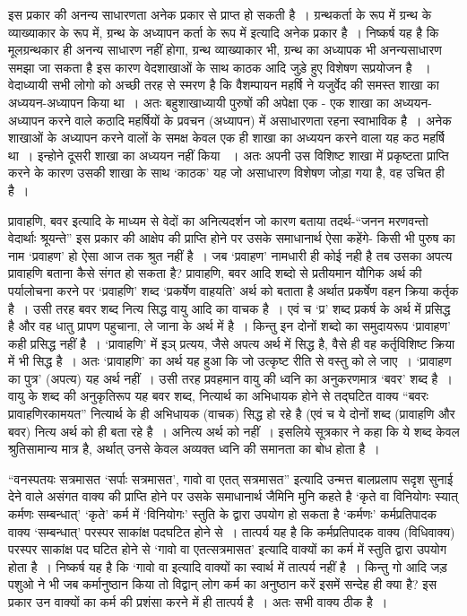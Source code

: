 इस प्रकार की अनन्य साधारणता अनेक प्रकार से प्राप्त हो सकती है~। ग्रन्थकर्ता के रूप में ग्रन्थ के व्याख्याकार के रूप में, ग्रन्थ के अध्यापन कर्ता के रूप में इत्यादि अनेक प्रकार है~। निष्कर्ष यह है कि मूलग्रन्थकार ही अनन्य साधारण नहीं होगा, ग्रन्थ व्याख्याकार भी, ग्रन्थ का अध्यापक भी अनन्यसाधारण समझा जा सकता है इस कारण वेदशाखाओं के साथ काठक आदि जुड़े हुए विशेषण सप्रयोजन है ~। वेदाध्यायी सभी लोगो को अच्छी तरह से स्मरण है कि वैशम्पायन महर्षि ने यजुर्वेद की समस्त शाखा का अध्ययन-अध्यापन किया था~। अतः बहुशाखाध्यायी पुरुषों की अपेक्षा एक - एक शाखा का अध्ययन-अध्यापन करने वाले कठादि महर्षियों के प्रवचन (अध्यापन) में असाधारणता रहना स्वाभाविक है~। अनेक शाखाओं के अध्यापन करने वालों के समक्ष केवल एक ही शाखा का अध्ययन करने वाला यह कठ महर्षि था~। इन्होने दूसरी शाखा का अध्ययन नहीं किया ~। अतः अपनी उस विशिष्ट शाखा में प्रकृष्टता प्राप्ति करने के कारण उसकी शाखा के साथ ‘काठक' यह जो असाधारण विशेषण जोड़ा गया है, वह उचित ही है~। 

प्रावाहणि, बवर इत्यादि के माध्यम से वेदों का अनित्यदर्शन जो कारण बताया तदर्थ-“जनन मरणवन्तो वेदार्थाः श्रूयन्ते” इस प्रकार की आक्षेप की प्राप्ति होने पर उसके समाधानार्थ ऐसा कहेंगे- किसी भी पुरुष का नाम ‘प्रवाहण' हो ऐसा आज तक श्रुत नहीं है~। जब ‘प्रवाहण' नामधारी ही कोई नही है तब उसका अपत्य प्रावाहणि बताना कैसे संगत हो सकता है? प्रावाहणि, बवर आदि शब्दो से प्रतीयमान यौगिक अर्थ की पर्यालोचना करने पर ‘प्रवाहणि' शब्द ‘प्रकर्षेण वाहयति' अर्थ को बताता है अर्थात प्रकर्षेण वहन क्रिया कर्तृक है~। उसी तरह बवर शब्द नित्य सिद्ध वायु आदि का वाचक है~। एवं च ‘प्र' शब्द प्रकर्ष के अर्थ में प्रसिद्ध है और वह धातु प्रापण पहुचाना, ले जाना के अर्थ में है~। किन्तु इन दोनों शब्दो का समुदायरूप ‘प्रावाहण' कही प्रसिद्ध नहीं है~। ‘प्रावाहणि' में इञ् प्रत्यय, जैसे अपत्य अर्थ में सिद्ध है, वैसे ही वह कर्तृविशिष्ट क्रिया में भी सिद्ध है~। अतः ‘प्रावाहणि' का अर्थ यह हुआ कि जो उत्कृष्ट रीति से वस्तु को ले जाए~। ‘प्रावाहण का पुत्र' (अपत्य) यह अर्थ नहीं~। उसी तरह प्रवहमान वायु की ध्वनि का अनुकरणमात्र ‘बवर' शब्द है~। वायु के शब्द की अनुकृतिरूप यह बवर शब्द, नित्यार्थ का अभिधायक होने से तद्घटित वाक्य “बवरः प्रावाहणिरकामयत” नित्यार्थ के ही अभिधायक (वाचक) सिद्ध हो रहे है (एवं च ये दोनों शब्द (प्रावाहणि और बवर) नित्य अर्थ को ही बता रहे है~। अनित्य अर्थ को नहीं~। इसलिये सूत्रकार ने कहा कि ये शब्द केवल श्रुतिसामान्य मात्र है, अर्थात् उनसे केवल अव्यक्त ध्वनि की समानता का बोध होता है~।

“वनस्पतयः सत्रमासत ‘सर्पाः सत्रमासत', गावो वा एतत् सत्रमासत” इत्यादि उन्मत्त बालप्रलाप सदृश सुनाई देने वाले असंगत वाक्य की प्राप्ति होने पर उसके समाधानार्थ जैमिनि मुनि कहते है ‘कृते वा विनियोगः स्यात् कर्मणः सम्बन्धात्' ‘कृते' कर्म में ‘विनियोगः' स्तुति के द्वारा उपयोग हो सकता है ‘कर्मणः' कर्मप्रतिपादक वाक्य ‘सम्बन्धात्' परस्पर साकांक्ष पदघटित होने से~। तात्पर्य यह है कि कर्मप्रतिपादक वाक्य (विधिवाक्य) परस्पर साकांक्ष पद घटित होने से ‘गावो वा एतत्सत्रमासत' इत्यादि वाक्यों का कर्म में स्तुति द्वारा उपयोग होता है~। निष्कर्ष यह है कि ‘गावो वा इत्यादि वाक्यों का स्वार्थ में तात्पर्य नहीं है~। किन्तु गो आदि जड़ पशुओ ने भी जब कर्मानुष्ठान किया तो विद्वान् लोग कर्म का अनुष्ठान करें इसमें सन्देह ही क्या है? इस प्रकार उन वाक्यों का कर्म की प्रशंसा करने में ही तात्पर्य है~। अतः सभी वाक्य ठीक है~।

